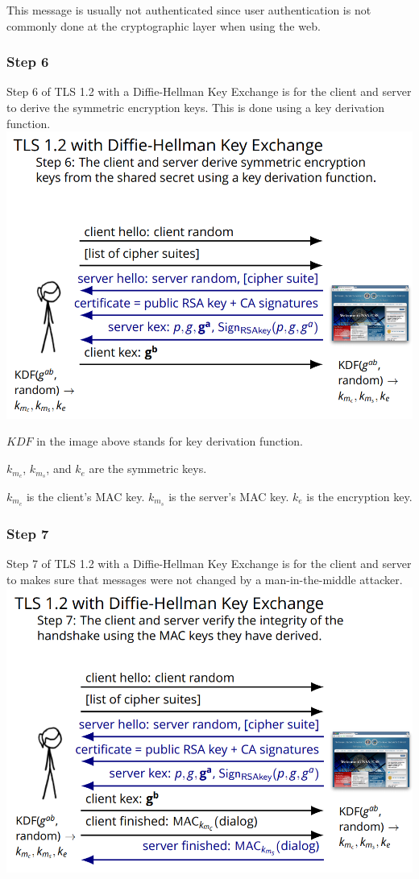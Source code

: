 \documentclass[11pt]{article} %
\begin{document}
This message is usually not authenticated since user authentication is not 
commonly done at the cryptographic layer when using the web.

\subsubsection{Step 6}
Step 6 of TLS 1.2 with a Diffie-Hellman Key Exchange is for the client and 
server to derive the symmetric encryption keys. This is done using a key 
derivation function. \\

\includegraphics[scale=.8]{./DiffieStep6.png}

$KDF$ in the image above stands for key derivation function.

$k_{m_c}$, $k_{m_s}$, and $k_{e}$ are the symmetric keys.

$k_{m_c}$ is the client's MAC key. $k_{m_s}$ is the server's MAC key. $k_{e}$ is the encryption key.

\newpage
\subsubsection{Step 7}
Step 7 of TLS 1.2 with a Diffie-Hellman Key Exchange is for the client and 
server to makes sure that messages were not changed by a man-in-the-middle 
attacker. \\

\includegraphics[scale=1.2]{./DiffieStep7.png}
\\
\end{document}
